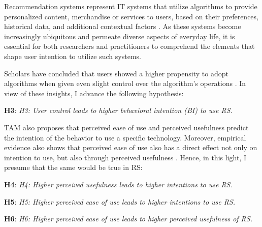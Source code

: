 \documentclass[a4paper,12pt]{article}
\begin{document}
Recommendation systems represent IT systems that utilize algorithms to provide personalized content, merchandise or services to users, based on their preferences, historical data, and additional contextual factors \citep{portugal2018use}. As these systems become increasingly ubiquitous and permeate diverse aspects of everyday life, it is essential for both researchers and practitioners to comprehend the elements that shape user intention to utilize such systems.

Scholars have concluded that users showed a higher propensity to adopt algorithms when given even slight control over the algorithm's operations \citep{dietvorstEtAl18}. In view of these insights, I advance the following hypothesis:

\textbf{H3}: \textit{H3: User control leads to higher behavioral intention (BI) to use RS.}

TAM also proposes that perceived ease of use and perceived usefulness predict the intention of the behavior to use a specific technology. Moreover, empirical evidence also shows that perceived ease of use also has a direct effect not only on intention to use, but also through perceived usefulness \citep{davisPerceivedUsefulnessPerceived1989}. Hence, in this light, I presume that the same would be true in RS: 

\textbf{H4}: \textit{H4: Higher perceived usefulness leads to higher intentions to use RS.}

\textbf{H5}: \textit{H5: Higher perceived ease of use leads to higher intentions to use RS.}

\textbf{H6}: \textit{H6: Higher perceived ease of use leads to higher perceived usefulness of RS.}
\end{document}
